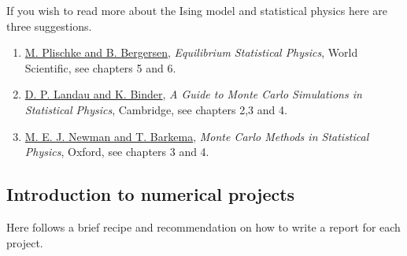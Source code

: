\documentclass[%
oneside,                 %
final,                   %
10pt]{article}
\begin{document}
\noindent
If you wish to read more about the Ising model and statistical physics here are three suggestions.

\begin{enumerate}
\item \href{{http://www.worldscientific.com/worldscibooks/10.1142/5660}}{M. Plischke and B. Bergersen}, \emph{Equilibrium Statistical Physics}, World Scientific, see chapters 5 and 6.

\item \href{{http://www.cambridge.org/no/academic/subjects/physics/computational-science-and-modelling/guide-monte-carlo-simulations-statistical-physics-4th-edition?format=HB}}{D. P. Landau and K. Binder}, \emph{A Guide to Monte Carlo Simulations in Statistical Physics}, Cambridge, see chapters 2,3 and 4.

\item \href{{https://global.oup.com/academic/product/monte-carlo-methods-in-statistical-physics-9780198517979?cc=no&lang=en&}}{M. E. J. Newman and T. Barkema}, \emph{Monte Carlo Methods in Statistical Physics}, Oxford, see chapters 3 and 4.
\end{enumerate}

\noindent
\subsection{Introduction to numerical projects}

Here follows a brief recipe and recommendation on how to write a report for each
project.
\end{document}
